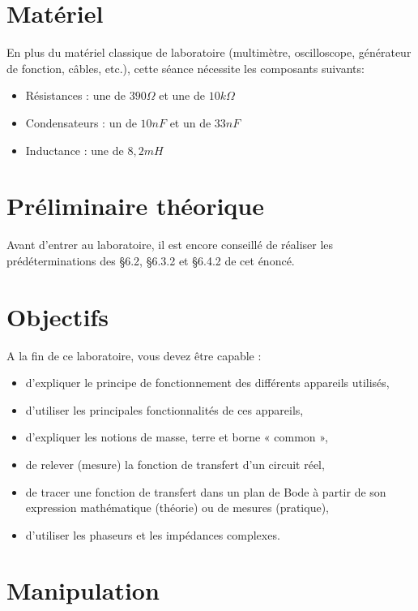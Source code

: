 \documentclass{../template/tp}
\begin{document}
\section{Matériel}
En plus du matériel classique de laboratoire (multimètre, oscilloscope, générateur de fonction, câbles, etc.), cette séance nécessite les composants suivants:
\begin{itemize}
\item Résistances : une de $390\Omega$ et une de $10k\Omega$
\item Condensateurs : un de $10nF$ et un de $33nF$
\item Inductance : une de $8,2mH$
\end{itemize}

\newpage
\section{Préliminaire théorique} %
Avant d'entrer au laboratoire, il est encore conseillé de réaliser les prédéterminations des §6.2, §6.3.2 et §6.4.2 de cet énoncé.

\section{Objectifs}
A la fin de ce laboratoire, vous devez être capable :
\begin{itemize}
\item d'expliquer le principe de fonctionnement des différents appareils utilisés,
\item d'utiliser les principales fonctionnalités de ces appareils,
\item d'expliquer les notions de masse, terre et borne « common »,
\item de relever (mesure) la fonction de transfert d'un circuit réel,
\item de tracer une fonction de transfert dans un plan de Bode à partir de son expression mathématique (théorie) ou de
mesures (pratique),
\item d'utiliser les phaseurs et les impédances complexes.
\end{itemize}



\section{Manipulation}
\end{document}
